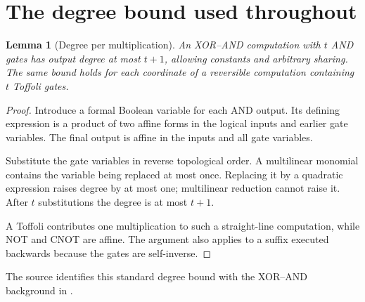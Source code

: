 \documentclass[11pt,letterpaper,oneside]{report}
\theoremstyle{komorebi}
\newtheorem{lemma}[theorem]{Lemma}
\begin{document}
\section{The degree bound used throughout}
\begin{lemma}[Degree per multiplication]\label{lem:degree}
An XOR--AND computation with $t$ AND gates has output degree at most $t+1$, allowing constants and arbitrary sharing. The same bound holds for each coordinate of a reversible computation containing $t$ Toffoli gates.
\end{lemma}
\begin{proof}
Introduce a formal Boolean variable for each AND output. Its defining expression is a product of two affine forms in the logical inputs and earlier gate variables. The final output is affine in the inputs and all gate variables.

Substitute the gate variables in reverse topological order. A multilinear monomial contains the variable being replaced at most once. Replacing it by a quadratic expression raises degree by at most one; multilinear reduction cannot raise it. After $t$ substitutions the degree is at most $t+1$.

A Toffoli contributes one multiplication to such a straight-line computation, while NOT and CNOT are affine. The argument also applies to a suffix executed backwards because the gates are self-inverse.
\end{proof}
The source identifies this standard degree bound with the XOR--AND background in \cite{soeken}.
\end{document}
